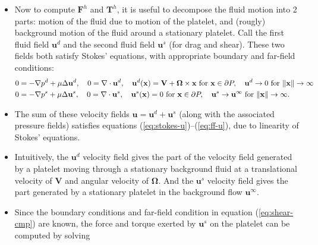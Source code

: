\documentclass{article}
\newcommand{\tn}{\textnormal}
\newcommand{\vect}[1]{\boldsymbol{\mathbf{#1}}}
\begin{document}
{\begin{itemize}
  be determined from force and torque balance on the entire body of
  the platelet. In particular, we need to balance the hydrodynamic
  forces (call them $\vect{F}^h$ and $\vect{T}^h$) acting on the
  platelet with the bond and other forces (call them
  $\vect{F}^\tn{other}$ and $\vect{T}^\tn{other}$) acting on the
  platelet. (\textbf{Note:} for consistency, all forces and torques
  are defined to be the force/torque acting \emph{on the platelet}).
\item Now to compute $\vect{F}^h$ and $\vect{T}^h$, it is useful to decompose the
  fluid motion into 2 parts: motion of the fluid due to motion of the
  platelet, and (rougly) background motion of the fluid around a
  stationary platelet. Call the first fluid field $\vect{u}^d$
  and the second fluid field $\vect{u}^s$ (for drag and
  shear). These two fields both satisfy Stokes' equations, with
  appropriate boundary and far-field conditions:
  \begin{align}
    0 &= -\nabla p^d + \mu \Delta \vect{u}^d, \quad 0 = \nabla
        \cdot \vect{u}^d, \quad \vect{u}^d(\vect{x}) =
        \vect{V} + \vect{\Omega} \times \vect{x} \tn{
        for } \vect{x} \in \partial P, \quad \vect{u}^d
        \rightarrow 0 \tn{ for } \|\mathbf{x}\| \rightarrow
        \infty \label{eq:static-cmp} \\ 
    0 &= -\nabla p^s + \mu \Delta \vect{u}^s, \quad 0 = \nabla
        \cdot \vect{u}^s, \quad \vect{u}^s(\vect{x}) =
        0 \tn{ for } \vect{x} \in \partial P, \quad
        \vect{u}^s \rightarrow \vect{u}^\infty \tn{ for }
        \|\mathbf{x}\| \rightarrow \infty. \label{eq:shear-cmp}
  \end{align}
\item The sum of these velocity fields
  $\vect{u} = \vect{u}^d + \vect{u}^s$ (along with the
  associated pressure fields) satisfies equations
  (\ref{eq:stokes-u})--(\ref{eq:ff-u}), due to linearity of Stokes'
  equations.
\item Intuitively, the $\vect{u}^d$ velocity field gives the part
  of the velocity field generated by a platelet moving through a
  stationary background fluid at a translational velocity of
  $\vect{V}$ and angular velocity of $\vect{\Omega}$. And the
  $\vect{u}^s$ velocity field gives the part generated by a
  stationary platelet in the background flow $\vect{u}^\infty$.
\item Since the boundary conditions and far-field condition in
  equation (\ref{eq:shear-cmp}) are known, the force and torque
  exerted by $\vect{u}^s$ on the platelet can be computed by solving

\end{itemize}}
\end{document}
